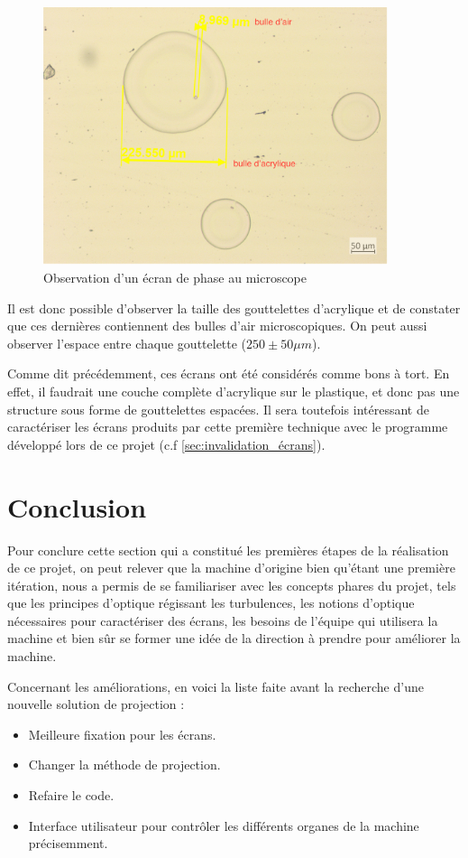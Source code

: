 \begin{figure}[H]
    \centering
    \includegraphics[width = 0.9\textwidth]{assets/figures/situation_initiale/observation_microscope.png}
    \caption{Observation d'un écran de phase au microscope}\label{fig:ecran_phase_beta_microscope}
\end{figure}
Il est donc possible d'observer la taille des gouttelettes d'acrylique et de constater que ces dernières contiennent des bulles d'air microscopiques.
On peut aussi observer l'espace entre chaque gouttelette ($250\pm 50 \mu m$).

Comme dit précédemment, ces écrans ont été considérés comme bons à tort. En effet, il faudrait une couche complète d'acrylique sur le plastique, et donc pas une structure sous forme de gouttelettes espacées.
Il sera toutefois intéressant de caractériser les écrans produits par cette première technique avec le programme développé lors de ce projet (c.f \autoref{sec:invalidation_écrans}).

\section{Conclusion}
Pour conclure cette section qui a constitué les premières étapes de la réalisation de ce projet, on peut relever que la machine d'origine bien qu'étant une première itération, nous a permis de se familiariser avec les concepts phares du projet, tels que
les principes d'optique régissant les turbulences, les notions d'optique nécessaires pour caractériser des écrans, les besoins de l'équipe qui utilisera la machine et bien sûr se former une idée de la direction à prendre pour améliorer la machine.

Concernant les améliorations, en voici la liste faite avant la recherche d'une nouvelle solution de projection :
\begin{itemize}
    \item Meilleure fixation pour les écrans.
    \item Changer la méthode de projection.
    \item Refaire le code.
    \item Interface utilisateur pour contrôler les différents organes de la machine précisemment.
\end{itemize}